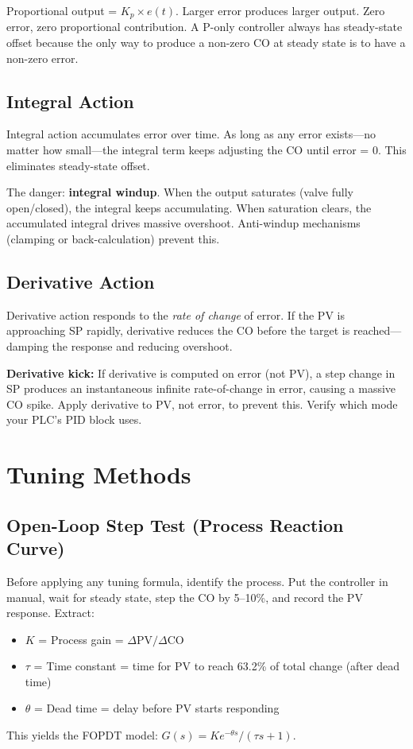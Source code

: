 \documentclass[12pt,twoside,openright]{memoir}
\begin{document}
Proportional output = $K_p \times e(t)$. Larger error produces larger output. Zero error, zero proportional contribution. A P-only controller always has steady-state offset because the only way to produce a non-zero CO at steady state is to have a non-zero error.

\section{Integral Action}

Integral action accumulates error over time. As long as any error exists---no matter how small---the integral term keeps adjusting the CO until error = 0. This eliminates steady-state offset.

The danger: \textbf{integral windup}. When the output saturates (valve fully open/closed), the integral keeps accumulating. When saturation clears, the accumulated integral drives massive overshoot. Anti-windup mechanisms (clamping or back-calculation) prevent this.

\section{Derivative Action}

Derivative action responds to the \emph{rate of change} of error. If the PV is approaching SP rapidly, derivative reduces the CO before the target is reached---damping the response and reducing overshoot.

\begin{commonmistakes}
\textbf{Derivative kick:} If derivative is computed on error (not PV), a step change in SP produces an instantaneous infinite rate-of-change in error, causing a massive CO spike. Apply derivative to PV, not error, to prevent this. Verify which mode your PLC's PID block uses.
\end{commonmistakes}

\chapter{Tuning Methods}

\section{Open-Loop Step Test (Process Reaction Curve)}

Before applying any tuning formula, identify the process. Put the controller in manual, wait for steady state, step the CO by 5--10\%, and record the PV response. Extract:
\begin{itemize}
  \item $K$ = Process gain = $\Delta\text{PV} / \Delta\text{CO}$
  \item $\tau$ = Time constant = time for PV to reach 63.2\% of total change (after dead time)
  \item $\theta$ = Dead time = delay before PV starts responding
\end{itemize}
This yields the FOPDT model: $G(s) = K e^{-\theta s} / (\tau s + 1)$.
\end{document}
